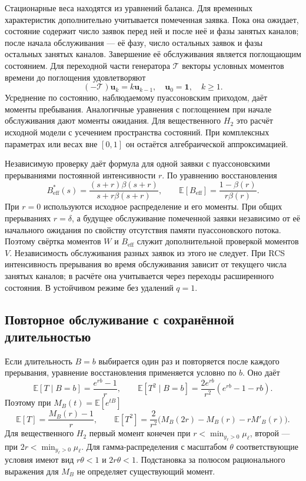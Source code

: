 Стационарные веса находятся из уравнений баланса. Для временных характеристик дополнительно учитывается помеченная заявка. Пока она ожидает, состояние содержит число заявок перед ней и после неё и фазы занятых каналов; после начала обслуживания --- её фазу, число остальных заявок и фазы остальных занятых каналов. Завершение её обслуживания является поглощающим состоянием. Для переходной части генератора \(\mathcal T\) векторы условных моментов времени до поглощения удовлетворяют
\[
(-\mathcal T)\boldsymbol u_k=k\boldsymbol u_{k-1},\quad
\boldsymbol u_0=\mathbf1,\quad k\ge1.
\]
Усреднение по состоянию, наблюдаемому пуассоновским приходом, даёт моменты пребывания. Аналогичные уравнения с поглощением при начале обслуживания дают моменты ожидания. Для вещественного \(H_2\) это расчёт исходной модели с усечением пространства состояний. При комплексных параметрах или весах вне \([0,1]\) он остаётся алгебраической аппроксимацией.

Независимую проверку даёт формула для одной заявки с пуассоновскими прерываниями постоянной интенсивности \(r\). По уравнению восстановления \cite{pal2017}
\[
B_{\mathrm{eff}}^*(s)=\frac{(s+r)\beta(s+r)}{s+r\beta(s+r)},\qquad
\mathbb E[B_{\mathrm{eff}}]=\frac{1-\beta(r)}{r\beta(r)}.
\]
При \(r=0\) используются исходное распределение и его моменты. При общих прерываниях \(r=\delta\), а будущее обслуживание помеченной заявки независимо от её начального ожидания по свойству отсутствия памяти пуассоновского потока. Поэтому свёртка моментов \(W\) и \(B_{\mathrm{eff}}\) служит дополнительной проверкой моментов \(V\). Независимость обслуживания разных заявок из этого не следует. При RCS интенсивность прерывания во время обслуживания зависит от текущего числа занятых каналов; в расчёте она учитывается через переходы расширенного состояния. В устойчивом режиме без удалений \(q=1\).

\subsection{Повторное обслуживание с сохранённой длительностью}
Если длительность \(B=b\) выбирается один раз и повторяется после каждого прерывания, уравнение восстановления применяется условно по \(b\). Оно даёт
\[
\mathbb E[T\mid B=b]=\frac{e^{rb}-1}{r},\qquad
\mathbb E[T^2\mid B=b]=\frac{2e^{rb}}{r^2}(e^{rb}-1-rb).
\]
Поэтому при \(M_B(t)=\mathbb E[e^{tB}]\)
\[
\mathbb E[T]=\frac{M_B(r)-1}{r},\qquad
\mathbb E[T^2]=\frac{2}{r^2}\bigl(M_B(2r)-M_B(r)-rM'_B(r)\bigr).
\]
Для вещественного \(H_2\) первый момент конечен при \(r<\min_{y_\ell>0}\mu_\ell\), второй --- при \(2r<\min_{y_\ell>0}\mu_\ell\). Для гамма-распределения с масштабом \(\theta\) соответствующие условия имеют вид \(r\theta<1\) и \(2r\theta<1\). Подстановка за полюсом рационального выражения для \(M_B\) не определяет существующий момент.

